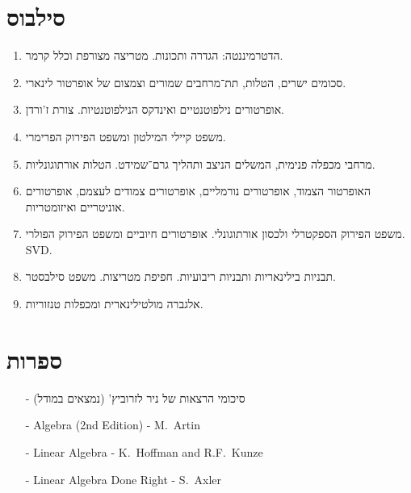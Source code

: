 \documentclass{article}
\begin{document}
\pagebreak

\section*{סילבוס}
\begin{enumerate}
\item הדטרמיננטה: הגדרה ותכונות. מטריצה מצורפת וכלל קרמר.
\item סכומים ישרים, הטלות, תת־מרחבים שמורים וצמצום של אופרטור לינארי.
\item אופרטורים נילפוטנטיים ואינדקס הנילפוטנטיות. צורת ז'ורדן.
\item משפט קיילי המילטון ומשפט הפירוק הפרימרי.
\item מרחבי מכפלה פנימית, המשלים הניצב ותהליך גרם־שמידט. הטלות אורתוגונליות.
\item האופרטור הצמוד, אופרטורים נורמליים, אופרטורים צמודים לעצמם, אופרטורים אוניטריים ואיזומטריות.
\item משפט הפירוק הספקטרלי ולכסון אורתוגונלי. אופרטורים חיוביים ומשפט הפירוק הפולרי. \textenglish{SVD}.
\item תבניות בילינאריות ותבניות ריבועיות. חפיפת מטריצות. משפט סילבסטר.
\item אלגברה מולטילינארית ומכפלות טנזוריות.
\end{enumerate}

\section*{ספרות}
\begin{itemize}
\item[-] סיכומי הרצאות של ניר לזרוביץ' (נמצאים במודל)
\item[-] \textenglish{Algebra (2nd Edition) - M.~Artin}
\item[-] \textenglish{Linear Algebra - K.~Hoffman and R.F.~Kunze}
\item[-] \textenglish{Linear Algebra Done Right - S.~Axler}
\end{itemize}
\end{document}
